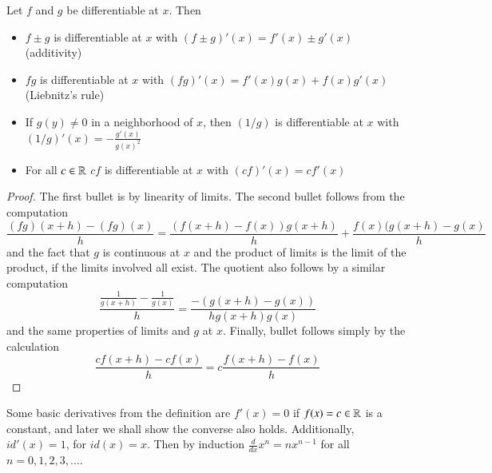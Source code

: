 \begin{proposition}
    Let $f$ and $g$ be differentiable at $x$. Then \begin{itemize}
        \item $f\pm g$ is differentiable at $x$ with $(f\pm g)'(x) = f'(x)\pm g'(x)$ (additivity) 
        \item $fg$ is differentiable at $x$ with $(fg)'(x) = f'(x)g(x)+f(x)g'(x)$ (Liebnitz's rule) 
        \item If $g(y) \neq 0$ in a neighborhood of $x$, then $(1/g)$ is differentiable at $x$ with $(1/g)'(x) = -\frac{g'(x)}{g(x)^2}$
        \item For all $c \in \mathbb R$ $cf$ is differentiable at $x$ with $(cf)'(x) = cf'(x)$
    \end{itemize}
\end{proposition}
\begin{proof}
    The first bullet is by linearity of limits. The second bullet follows from the computation \begin{equation*}
        \frac{(fg)(x+h) - (fg)(x)}{h} = \frac{(f(x+h)-f(x))g(x+h)}{h} + \frac{f(x)(g(x+h)-g(x)}{h}
    \end{equation*}
    and the fact that $g$ is continuous at $x$ and the product of limits is the limit of the product, if the limits involved all exist. The quotient also follows by a similar computation \begin{equation*}
        \frac{\frac{1}{g(x+h)} - \frac{1}{g(x)}}{h} = \frac{-(g(x+h)-g(x))}{hg(x+h)g(x)}
    \end{equation*}
    and the same properties of limits and $g$ at $x$. Finally, bullet follows simply by the calculation \begin{equation*}
        \frac{cf(x+h) - cf(x)}{h} = c\frac{f(x+h)-f(x)}{h}
    \end{equation*}
\end{proof}

Some basic derivatives from the definition are $f'(x) = 0$ if $f(x) = c\in\mathbb R$ is a constant, and later we shall show the converse also holds. Additionally, $id'(x) = 1$, for $id(x) = x$. Then by induction $\frac{d}{dx}x^n = nx^{n-1}$ for all $n = 0,1,2,3,...$.

